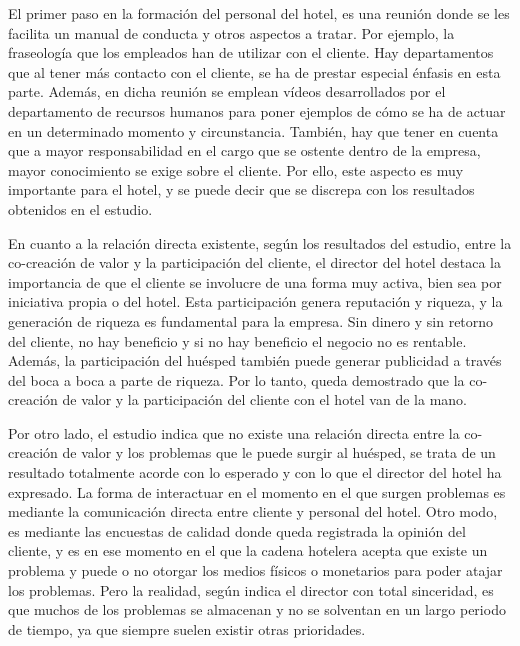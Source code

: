 El primer paso en la formación del personal del hotel, es una reunión donde se les facilita un manual de conducta y otros aspectos a tratar. Por ejemplo, la fraseología que los empleados han de utilizar con el cliente. Hay departamentos que al tener más contacto con el cliente, se ha de prestar especial énfasis en esta parte. Además, en dicha reunión se emplean vídeos desarrollados por el departamento de recursos humanos para poner ejemplos de cómo se ha de actuar en un determinado momento y circunstancia. También, hay que tener en cuenta que a mayor responsabilidad en el cargo que se ostente dentro de la empresa, mayor conocimiento se exige sobre el cliente. Por ello, este aspecto es muy importante para el hotel, y se puede decir que se discrepa con los resultados obtenidos en el estudio.

En cuanto a la relación directa existente, según los resultados del estudio, entre la co-creación de valor y la participación del cliente, el director del hotel destaca la importancia de que el cliente se involucre de una forma muy activa, bien sea por iniciativa propia o del hotel. Esta participación genera reputación y riqueza, y la generación de riqueza es fundamental para la empresa. Sin dinero y sin retorno del cliente, no hay beneficio y si no hay beneficio el negocio no es rentable. Además, la participación del huésped también puede generar publicidad a través del boca a boca a parte de riqueza. Por lo tanto, queda demostrado que la co-creación de valor y la participación del cliente con el hotel van de la mano.

Por otro lado, el estudio indica que no existe una relación directa entre la co-creación de valor y los problemas que le puede surgir al huésped, se trata de un resultado totalmente acorde con lo esperado y con lo que el director del hotel ha expresado. La forma de interactuar en el momento en el que surgen problemas es mediante la comunicación directa entre cliente y personal del hotel. Otro modo, es mediante las encuestas de calidad donde queda registrada la opinión del cliente, y es en ese momento en el que la cadena hotelera acepta que existe un problema y puede o no otorgar los medios físicos o monetarios para poder atajar los problemas. Pero la realidad, según indica el director con total sinceridad, es que muchos de los problemas se almacenan y no se solventan en un largo periodo de tiempo, ya que siempre suelen existir otras prioridades.

